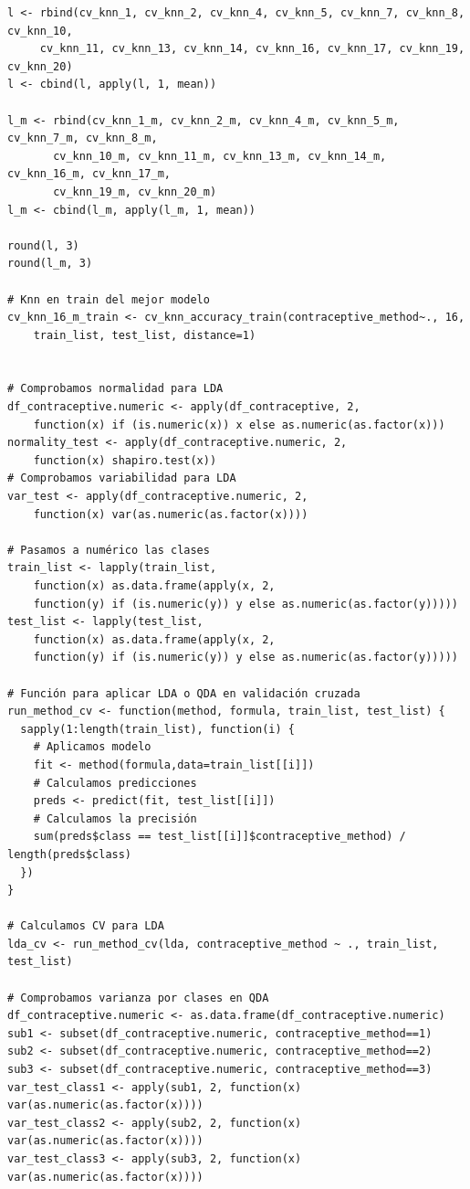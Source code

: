 \documentclass[a4paper,12pt, oneside]{book}
\begin{document}
\begin{verbatim}
l <- rbind(cv_knn_1, cv_knn_2, cv_knn_4, cv_knn_5, cv_knn_7, cv_knn_8, cv_knn_10, 
	 cv_knn_11, cv_knn_13, cv_knn_14, cv_knn_16, cv_knn_17, cv_knn_19, cv_knn_20)
l <- cbind(l, apply(l, 1, mean))

l_m <- rbind(cv_knn_1_m, cv_knn_2_m, cv_knn_4_m, cv_knn_5_m, cv_knn_7_m, cv_knn_8_m,
       cv_knn_10_m, cv_knn_11_m, cv_knn_13_m, cv_knn_14_m, cv_knn_16_m, cv_knn_17_m,
       cv_knn_19_m, cv_knn_20_m)
l_m <- cbind(l_m, apply(l_m, 1, mean))

round(l, 3)
round(l_m, 3)

# Knn en train del mejor modelo
cv_knn_16_m_train <- cv_knn_accuracy_train(contraceptive_method~., 16, 
	train_list, test_list, distance=1)


# Comprobamos normalidad para LDA
df_contraceptive.numeric <- apply(df_contraceptive, 2, 
	function(x) if (is.numeric(x)) x else as.numeric(as.factor(x)))
normality_test <- apply(df_contraceptive.numeric, 2, 
	function(x) shapiro.test(x))
# Comprobamos variabilidad para LDA
var_test <- apply(df_contraceptive.numeric, 2, 
	function(x) var(as.numeric(as.factor(x))))

# Pasamos a numérico las clases
train_list <- lapply(train_list, 
	function(x) as.data.frame(apply(x, 2, 
	function(y) if (is.numeric(y)) y else as.numeric(as.factor(y)))))
test_list <- lapply(test_list, 
	function(x) as.data.frame(apply(x, 2, 
	function(y) if (is.numeric(y)) y else as.numeric(as.factor(y)))))

# Función para aplicar LDA o QDA en validación cruzada
run_method_cv <- function(method, formula, train_list, test_list) {
  sapply(1:length(train_list), function(i) {
    # Aplicamos modelo
    fit <- method(formula,data=train_list[[i]])
    # Calculamos predicciones
    preds <- predict(fit, test_list[[i]])
    # Calculamos la precisión
    sum(preds$class == test_list[[i]]$contraceptive_method) / length(preds$class)
  })
}

# Calculamos CV para LDA
lda_cv <- run_method_cv(lda, contraceptive_method ~ ., train_list, test_list)

# Comprobamos varianza por clases en QDA
df_contraceptive.numeric <- as.data.frame(df_contraceptive.numeric)
sub1 <- subset(df_contraceptive.numeric, contraceptive_method==1)
sub2 <- subset(df_contraceptive.numeric, contraceptive_method==2)
sub3 <- subset(df_contraceptive.numeric, contraceptive_method==3)
var_test_class1 <- apply(sub1, 2, function(x) var(as.numeric(as.factor(x))))
var_test_class2 <- apply(sub2, 2, function(x) var(as.numeric(as.factor(x))))
var_test_class3 <- apply(sub3, 2, function(x) var(as.numeric(as.factor(x))))


\end{verbatim}
\end{document}
